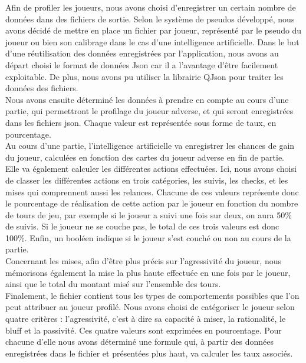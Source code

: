 \documentclass{report}
\begin{document}
\hspace{0.5cm}Afin de profiler les joueurs, nous avons choisi d'enregistrer un certain nombre de données dans des fichiers de sortie. Selon le système de pseudos développé, nous avons décidé de mettre en place un fichier par joueur, représenté par le pseudo du joueur ou bien son calibrage dans le cas d'une intelligence artificielle. Dans le but d'une réutilisation des données enregistrées par l'application, nous avons au départ choisi le format de données Json car il a l'avantage d'être facilement exploitable. De plus, nous avons pu utiliser la librairie QJson pour traiter les données des fichiers.\\

Nous avons ensuite déterminé les données à prendre en compte au cours d'une partie, qui permettront le profilage du joueur adverse, et qui seront enregistrées dans les fichiers json. Chaque valeur est représentée sous forme de taux, en pourcentage.\\

Au cours d'une partie, l'intelligence artificielle va enregistrer les chances de gain du joueur, calculées en fonction des cartes du joueur adverse en fin de partie.\\

Elle va également calculer les différentes actions effectuées. Ici, nous avons choisi de classer les différentes actions en trois catégories, les suivis, les checks, et les mises qui comprennent aussi les relances. Chacune de ces valeurs représente donc le pourcentage de réalisation de cette action par le joueur en fonction du nombre de tours de jeu, par exemple si le joueur a suivi une fois sur deux, on aura 50\% de suivis. Si le joueur ne se couche pas, le total de ces trois valeurs est donc 100\%. Enfin, un booléen indique si le joueur s'est couché ou non au cours de la partie.\\

Concernant les mises, afin d'être plus précis sur l'agressivité du joueur, nous mémorisons également la mise la plus haute effectuée en une fois par le joueur, ainsi que le total du montant misé sur l'ensemble des tours.\\

Finalement, le fichier contient tous les types de comportements possibles que l'on peut attribuer au joueur profilé. Nous avons choisi de catégoriser le joueur selon quatre critères : l'agressivité, c'est à dire sa capacité à miser, la rationalité, le bluff et la passivité. Ces quatre valeurs sont exprimées en pourcentage. Pour chacune d'elle nous avons déterminé une formule qui, à partir des données enregistrées dans le fichier et présentées plus haut, va calculer les taux associés.\\
\end{document}
